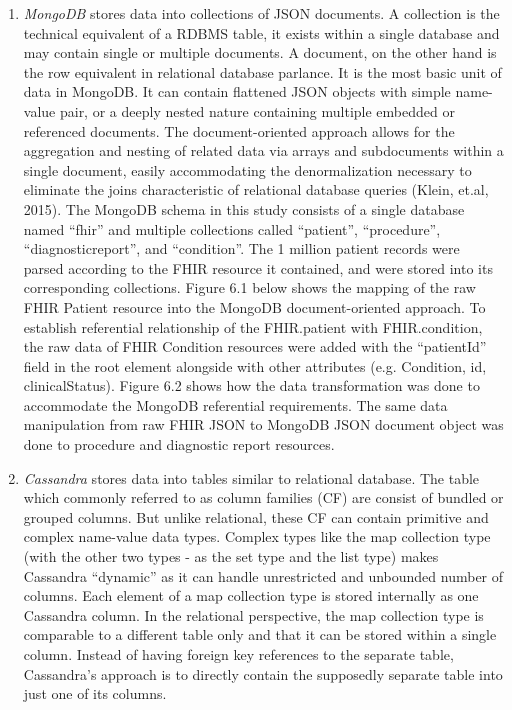 \documentclass[5p]{elsarticle}
\begin{document}
\begin{enumerate}
\item \emph{MongoDB} stores data into collections of JSON documents. A collection is the technical equivalent of a RDBMS table, it exists within a single database and may contain single or multiple documents. A document, on the other hand is the row equivalent in relational database parlance. It is the most basic unit of data in MongoDB. It can contain flattened JSON objects with simple name-value pair, or a deeply nested nature containing multiple embedded or referenced documents. The document-oriented approach allows for the aggregation and nesting of related data via arrays and subdocuments within a single document, easily accommodating the denormalization necessary to eliminate the joins characteristic of relational database queries (Klein, et.al, 2015). The MongoDB schema in this study consists of a single database named “fhir” and multiple collections called “patient”, “procedure”, “diagnosticreport”, and “condition”. The 1 million patient records were parsed according to the FHIR resource it contained, and were stored into its corresponding collections. Figure 6.1 below shows the mapping of the raw FHIR Patient resource into the MongoDB document-oriented approach. 
To establish referential relationship of the FHIR.patient with FHIR.condition, the raw data of FHIR Condition resources were added with the “patientId” field in the root element alongside with other attributes (e.g. Condition, id, clinicalStatus). Figure 6.2 shows how the data transformation was done to accommodate the MongoDB referential requirements. The same data manipulation from raw FHIR JSON to MongoDB JSON document object was done to procedure and diagnostic report resources.
\\
\item \emph{Cassandra} stores data into tables similar to relational database. The table which commonly referred to as column families (CF) are consist of bundled or grouped columns. But unlike relational, these CF can contain primitive and complex name-value data types. Complex types like the map collection type (with the other two types - as the set type and the list type) makes Cassandra “dynamic” as it can handle unrestricted and unbounded number of columns. Each element of a map collection type is stored internally as one Cassandra column. In the relational perspective, the map collection type is comparable to a different table only and that it can be stored within a single column. Instead of having foreign key references to the separate table, Cassandra’s approach is to directly contain the supposedly separate table into just one of its columns. 

\end{enumerate}
\end{document}
